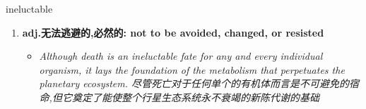 
\begin{frame}
{\huge ineluctable}
\begin{center}
\begin{enumerate}\Large
  \item \textbf{adj.无法逃避的,必然的: not to be avoided, changed, or resisted}
  \begin{itemize}
    \item \em{\Large{Although death is an ineluctable fate for any and every individual organism, it lays the foundation of the metabolism that perpetuates the planetary ecosystem. 尽管死亡对于任何单个的有机体而言是不可避免的宿命,但它奠定了能使整个行星生态系统永不衰竭的新陈代谢的基础}}
  \end{itemize}
\end{enumerate}
\end{center}
\end{frame}
